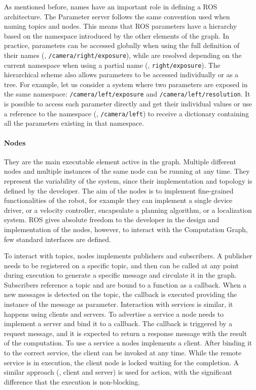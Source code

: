 As mentioned before, names have an important role in defining a ROS architecture. The Parameter server follows the same convention used when naming topics and nodes. This means that ROS parameters have a hierarchy based on the namespace introduced by the other elements of the graph. In practice, parameters can be accessed globally when using the full definition of their names (\eg, \texttt{/camera/right/exposure}), while are resolved depending on the current namespace when using a partial name (\eg, \texttt{right/exposure}). The hierarchical scheme also allows parameters to be accessed individually or as a tree. For example, let us consider a system where two parameters are exposed in the same namespace: \texttt{/camera/left/exposure} and \texttt{/camera/left/resolution}. It is possible to access each parameter directly and get their individual values or use a reference to the namespace (\ie, \texttt{/camera/left}) to receive a dictionary containing all the parameters existing in that namespace.

\paragraph{Nodes} They are the main executable element active in the graph. Multiple different nodes and multiple instances of the same node can be running at any time. They represent the variability of the system, since their implementation and topology is defined by the developer. The aim of the nodes is to implement fine-grained functionalities of the robot, for example they can implement a single device driver, or a velocity controller, encapsulate a planning algorithm, or a localization system. ROS gives absolute freedom to the developer in the design and implementation of the nodes, however, to interact with the Computation Graph, few standard interfaces are defined.

To interact with topics, nodes implements publishers and subscribers. A publisher needs to be registered on a specific topic, and then can be called at any point during execution to generate a specific message and circulate it in the graph. Subscribers reference a topic and are bound to a function as a callback. When a new messages is detected on the topic, the callback is executed providing the instance of the message as parameter. Interaction with services is similar, it happens using clients and servers. To advertise a service a node needs to implement a server and bind it to a callback. The callback is triggered by a request message, and it is expected to return a response message with the result of the computation. To use a service a nodes implements a client. After binding it to the correct service, the client can be invoked at any time. While the remote service is in execution, the client node is locked waiting for the completion. A similar approach (\ie, client and server) is used for action, with the significant difference that the execution is non-blocking.

